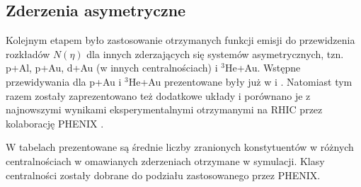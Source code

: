 \documentclass[a4paper,12pt]{article}
\begin{document}
\subsection{Zderzenia asymetryczne}
Kolejnym etapem było zastosowanie otrzymanych funkcji emisji do przewidzenia rozkładów $N(\eta)$ dla innych zderzających się systemów asymetrycznych, tzn. p+Al, p+Au, d+Au (w innych centralnościach) i $^3$He+Au. Wstępne przewidywania dla p+Au i $^3$He+Au prezentowane były już w \cite{Barej:pracaInz18} i \cite{Barej:2017kcw}. Natomiast tym razem zostały zaprezentowano też dodatkowe układy i porównano je z najnowszymi wynikami eksperymentalnymi otrzymanymi na RHIC przez kolaborację PHENIX \cite{Adare:2018toe}.

W tabelach  prezentowane są średnie liczby zranionych konstytuentów w różnych centralnościach w omawianych zderzeniach otrzymane w symulacji. Klasy centralności zostały dobrane do podziału zastosowanego przez PHENIX.
\end{document}
